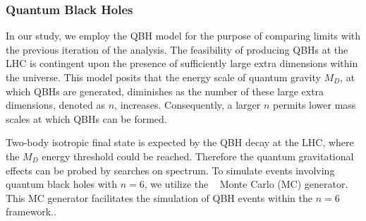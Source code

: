 \subsubsection{Quantum Black Holes}
In our study, we employ the QBH model for the purpose of comparing limits with the previous iteration of the analysis. The feasibility of producing QBHs at the LHC is contingent upon the presence of sufficiently large extra dimensions within the universe. This model posits that the energy scale of quantum gravity $M_{D}$, at which QBHs are generated, diminishes as the number of these large extra dimensions, denoted as $n$, increases. Consequently, a larger $n$ permits lower mass scales at which QBHs can be formed.

Two-body isotropic final state is expected by the QBH decay at the LHC, where the $M_D$ energy threshold could be reached. Therefore the quantum gravitational effects can be probed by searches on \mjj spectrum. To simulate events involving quantum black holes with $n=6$, we utilize the \BlackMax~\cite{Dai:2007ki} Monte Carlo (MC) generator. This MC generator facilitates the simulation of QBH events within the $n=6$ framework..



